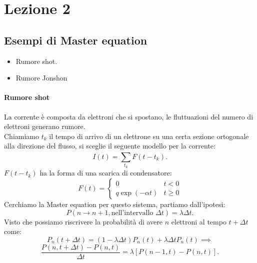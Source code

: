 \section{Lezione 2}%
\label{sub:Lezione 2}

\subsection{Esempi di Master equation}%
\begin{itemize}
    \item Rumore shot.
    \item Rumore Jonshon
\end{itemize}
\paragraph{Rumore shot}%
La corrente è composta da elettroni che si spostano, le fluttuazioni del numero di elettroni generano rumore.\\
Chiamiamo $t_k$ il tempo di arrivo di un elettrone su una certa sezione ortogonale alla direzione del flusso, si sceglie il seguente modello per la corrente:
\[
    I(t) = \sum_{t_k}^{} F(t-t_k) 
.\] 
$F(t-t_k)$ ha la forma di una scarica di condensatore:
\[
    F(t) = \begin{cases}
	0	 			&t<0\\
	q \exp\left(-\alpha t\right) 	&t \ge 0
    \end{cases}
\] 
Cerchiamo la Master equation per questo sistema, partiamo dall'ipotesi:
\[
    P(n\to n+1, \text{nell'intervallo }\Delta  t) = \lambda \Delta t
.\] 
Visto che possiamo riscrivere la probabilità di avere $n$ elettroni al tempo $t+\Delta t$ come: 
\[
    P_n(t+\Delta  t) = \left(1-\lambda\Delta t\right)P_n(t) + \lambda\Delta t  P_n(t)\implies 
\] 
\[
	\frac{P(n, t+\Delta  t) - P(n,t)}{\Delta t} = \lambda\left[P(n-1,t) -P(n,t)\right] 
.\] 
